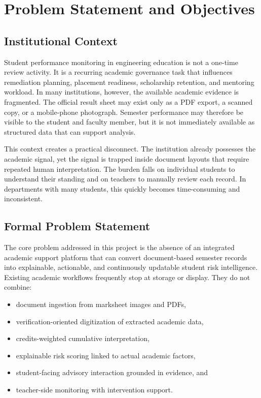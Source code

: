 \chapter{Problem Statement and Objectives}

\section{Institutional Context}
Student performance monitoring in engineering education is not a one-time review activity. It is a recurring academic governance task that influences remediation planning, placement readiness, scholarship retention, and mentoring workload. In many institutions, however, the available academic evidence is fragmented. The official result sheet may exist only as a PDF export, a scanned copy, or a mobile-phone photograph. Semester performance may therefore be visible to the student and faculty member, but it is not immediately available as structured data that can support analysis.

This context creates a practical disconnect. The institution already possesses the academic signal, yet the signal is trapped inside document layouts that require repeated human interpretation. The burden falls on individual students to understand their standing and on teachers to manually review each record. In departments with many students, this quickly becomes time-consuming and inconsistent.

\section{Formal Problem Statement}
The core problem addressed in this project is the absence of an integrated academic support platform that can convert document-based semester records into explainable, actionable, and continuously updatable student risk intelligence. Existing academic workflows frequently stop at storage or display. They do not combine:
\begin{itemize}[leftmargin=*]
\item document ingestion from marksheet images and PDFs,
\item verification-oriented digitization of extracted academic data,
\item credits-weighted cumulative interpretation,
\item explainable risk scoring linked to actual academic factors,
\item student-facing advisory interaction grounded in evidence, and
\item teacher-side monitoring with intervention support.
\end{itemize}

